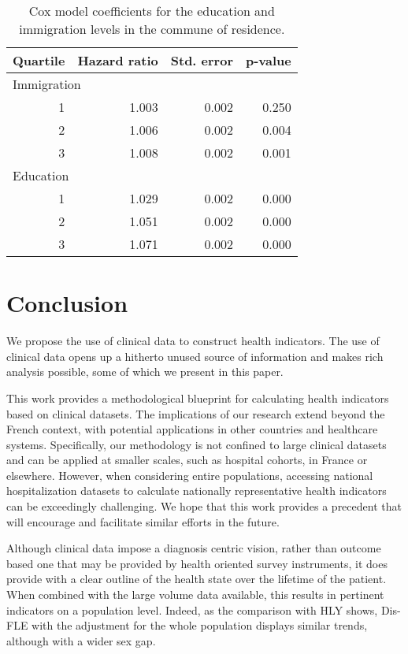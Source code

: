 \documentclass[risks,article,submit,moreauthors,pdftex]{Definitions/mdpi}
\begin{document}
\begin{longtable}{rrrr}
\caption{
\label{tab:cox-f3-coefs-immi-dip}Cox model coefficients for the education and immigration levels in the commune of residence.
} \\ 
\toprule
Quartile & Hazard ratio & Std. error & p-value \\ 
\midrule
\multicolumn{4}{l}{Immigration} \\ 
\midrule
1 & 1.003 & 0.002 & 0.250 \\ 
2 & 1.006 & 0.002 & 0.004 \\ 
3 & 1.008 & 0.002 & 0.001 \\ 
\midrule
\multicolumn{4}{l}{Education} \\ 
\midrule
1 & 1.029 & 0.002 & 0.000 \\ 
2 & 1.051 & 0.002 & 0.000 \\ 
3 & 1.071 & 0.002 & 0.000 \\ 
\bottomrule
\end{longtable}

\hypertarget{conclusion}{%
\section{\texorpdfstring{Conclusion
\label{sec:discuss}}{Conclusion }}\label{conclusion}}

We propose the use of clinical data to construct health indicators. The
use of clinical data opens up a hitherto unused source of information
and makes rich analysis possible, some of which we present in this
paper.

This work provides a methodological blueprint for calculating health
indicators based on clinical datasets. The implications of our research
extend beyond the French context, with potential applications in other
countries and healthcare systems. Specifically, our methodology is not
confined to large clinical datasets and can be applied at smaller
scales, such as hospital cohorts, in France or elsewhere. However, when
considering entire populations, accessing national hospitalization
datasets to calculate nationally representative health indicators can be
exceedingly challenging. We hope that this work provides a precedent
that will encourage and facilitate similar efforts in the future.

Although clinical data impose a diagnosis centric vision, rather than
outcome based one that may be provided by health oriented survey
instruments, it does provide with a clear outline of the health state
over the lifetime of the patient. When combined with the large volume
data available, this results in pertinent indicators on a population
level. Indeed, as the comparison with HLY shows, Dis-FLE with the
adjustment for the whole population displays similar trends, although
with a wider sex gap.
\end{document}
